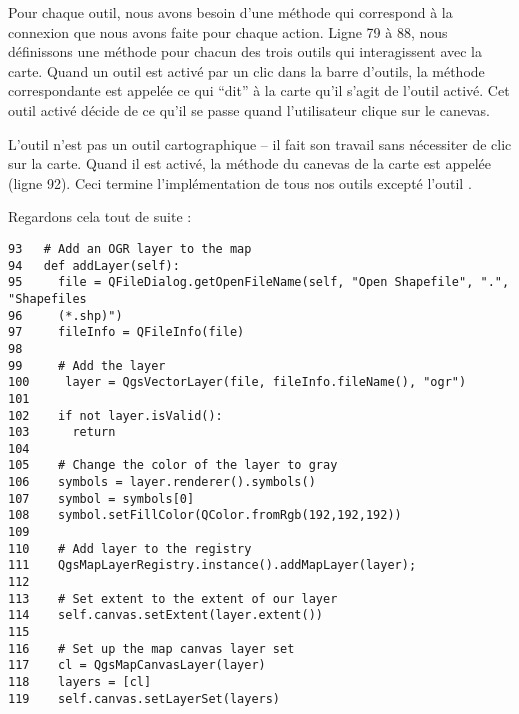 Pour chaque outil, nous avons besoin d'une méthode qui correspond à la connexion que nous avons faite pour chaque action. Ligne 79 à 88, nous définissons une méthode pour chacun des trois outils qui interagissent avec la carte. Quand un outil est activé par un clic dans la barre d'outils, la méthode correspondante est appelée ce qui ``dit'' à la carte qu'il s'agit de l'outil activé. Cet outil activé décide de ce qu'il se passe quand l'utilisateur clique sur le canevas.

L'outil  n'est pas un outil cartographique -- il fait son travail sans nécessiter de clic sur la carte. Quand il est activé, la méthode  du canevas de la carte est appelée (ligne 92). Ceci termine l'implémentation de tous nos outils excepté l'outil .

Regardons cela tout de suite :
\begin{verbatim}
93   # Add an OGR layer to the map
94   def addLayer(self):
95     file = QFileDialog.getOpenFileName(self, "Open Shapefile", ".", "Shapefiles
96     (*.shp)")
97     fileInfo = QFileInfo(file)
98 
99     # Add the layer
100     layer = QgsVectorLayer(file, fileInfo.fileName(), "ogr")
101
102    if not layer.isValid():
103      return
104
105    # Change the color of the layer to gray
106    symbols = layer.renderer().symbols()
107    symbol = symbols[0]
108    symbol.setFillColor(QColor.fromRgb(192,192,192))
109
110    # Add layer to the registry
111    QgsMapLayerRegistry.instance().addMapLayer(layer);
112
113    # Set extent to the extent of our layer
114    self.canvas.setExtent(layer.extent())
115
116    # Set up the map canvas layer set
117    cl = QgsMapCanvasLayer(layer)
118    layers = [cl]
119    self.canvas.setLayerSet(layers)
\end{verbatim}


